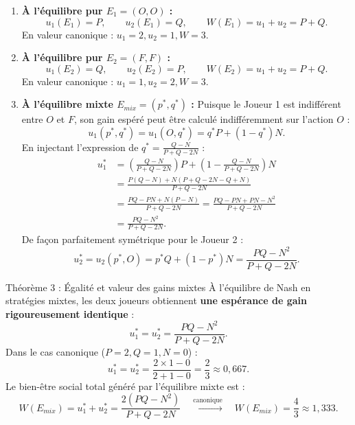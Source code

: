 \documentclass[11pt,a4paper]{article}
\begin{document}
\begin{enumerate}[label=(\alph*),leftmargin=1.5em]
    \item \textbf{À l'équilibre pur $E_1 = (O, O)$ :}
    \begin{equation}
    u_1(E_1) = P, \qquad u_2(E_1) = Q, \qquad W(E_1) = u_1 + u_2 = P + Q.
    \end{equation}
    En valeur canonique : $u_1 = 2, u_2 = 1, W = 3$.
    
    \item \textbf{À l'équilibre pur $E_2 = (F, F)$ :}
    \begin{equation}
    u_1(E_2) = Q, \qquad u_2(E_2) = P, \qquad W(E_2) = u_1 + u_2 = P + Q.
    \end{equation}
    En valeur canonique : $u_1 = 1, u_2 = 2, W = 3$.
    
    \item \textbf{À l'équilibre mixte $E_{mix} = (p^*, q^*)$ :}
    Puisque le Joueur 1 est indifférent entre $O$ et $F$, son gain espéré peut être calculé indifféremment sur l'action $O$ :
    \[
    u_1(p^*, q^*) = u_1(O, q^*) = q^* P + (1 - q^*) N.
    \]
    En injectant l'expression de $q^* = \frac{Q - N}{P + Q - 2N}$ :
    \begin{align}
    u_1^* &= \left( \frac{Q - N}{P + Q - 2N} \right) P + \left( 1 - \frac{Q - N}{P + Q - 2N} \right) N \nonumber \\
          &= \frac{P(Q - N) + N(P + Q - 2N - Q + N)}{P + Q - 2N} \nonumber \\
          &= \frac{PQ - PN + N(P - N)}{P + Q - 2N} = \frac{PQ - PN + PN - N^2}{P + Q - 2N} \nonumber \\
          &= \frac{PQ - N^2}{P + Q - 2N}.
    \end{align}
    De façon parfaitement symétrique pour le Joueur 2 :
    \begin{equation}
    u_2^* = u_2(p^*, O) = p^* Q + (1 - p^*) N = \frac{PQ - N^2}{P + Q - 2N}.
    \end{equation}
\end{enumerate}

\begin{propbox}{Théorème 3 : Égalité et valeur des gains mixtes}
À l'équilibre de Nash en stratégies mixtes, les deux joueurs obtiennent \textbf{une espérance de gain rigoureusement identique} :
\begin{equation}\label{eq:gain_mixte_formel}
\boxed{u_1^* = u_2^* = \frac{PQ - N^2}{P + Q - 2N}}.
\end{equation}
Dans le cas canonique ($P = 2, Q = 1, N = 0$) :
\begin{equation}
u_1^* = u_2^* = \frac{2 \times 1 - 0}{2 + 1 - 0} = \frac{2}{3} \approx 0{,}667.
\end{equation}
Le bien-être social total généré par l'équilibre mixte est :
\begin{equation}
W(E_{mix}) = u_1^* + u_2^* = \frac{2(PQ - N^2)}{P + Q - 2N} \quad \xrightarrow{\text{canonique}} \quad W(E_{mix}) = \frac{4}{3} \approx 1{,}333.
\end{equation}
\end{propbox}
\end{document}
